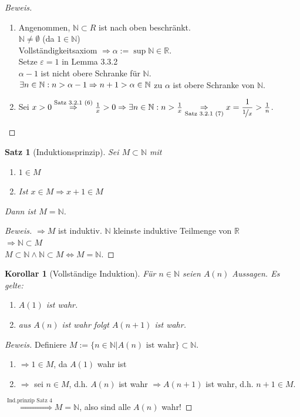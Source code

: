 \documentclass[12pt,a4paper,titlepage]{article} %
\newtheorem{satz}{Satz}[subsection]
\newtheorem{kor}{Korollar}
\theoremstyle{definition}
\theoremstyle{remark}
\newenvironment{bew}{\begin{proof}[Beweis]}{\end{proof}}
\begin{document}
\begin{bew}
	\begin{enumerate}
		\item Angenommen, $\mathbb{N}\subset{R}$ ist nach oben beschränkt.\\
		$\mathbb{N} \neq \emptyset$ (da $1\in\mathbb{N}$)\\
		Vollständigkeitsaxiom $\Rightarrow \alpha := \sup \mathbb{N} \in \mathbb{R}$.\\
		Setze $\varepsilon = 1$ in Lemma 3.3.2\\ %
		$\alpha -1$ ist nicht obere Schranke für $\mathbb{N}$.\\
		$\exists n\in \mathbb{N}: n>\alpha-1\\
		\Rightarrow n+1 > \alpha \in \mathbb{N}$ \Lightning  zu $\alpha$ ist obere Schranke von $\mathbb{N}$.
		\item Sei $x>0 \overset{\text{Satz 3.2.1 (6)}}{\Rightarrow} \frac{1}{x} > 0\Rightarrow \exists n\in \mathbb{N}: n > \frac{1}{x}\underset{\text{Satz 3.2.1 (7)}}{\Rightarrow} x = \dfrac{1}{\nicefrac{1}{x}} > \frac{1}{n}$. %
	\end{enumerate}
\end{bew}
\begin{satz}[Induktionsprinzip]
	Sei $M\subset \mathbb{N}$ mit 
	\begin{enumerate}
		\item $1\in M$
		\item Ist $x\in M \Rightarrow x+1 \in M$
	\end{enumerate}
	Dann ist $M= \mathbb{N}$.
\end{satz}
\begin{bew}
	$\Rightarrow M$ ist induktiv. $\mathbb{N}$ kleinste induktive Teilmenge von $\mathbb{R}$\\
	$\Rightarrow \mathbb{N} \subset M$\\
	$M\subset \mathbb{N} \wedge \mathbb{N} \subset M \Leftrightarrow M = \mathbb{N}$.
\end{bew}
\begin{kor}[Vollständige Induktion]
	Für $n\in\mathbb{N}$ seien $A(n)$ Aussagen.
	Es gelte:
	\begin{enumerate}
		\item $A(1)$ ist wahr.
		\item aus $A(n)$ ist wahr folgt $A(n+1)$ ist wahr.
	\end{enumerate}
\end{kor}
\begin{bew}
	Definiere $M := \{n\in \mathbb{N}| A(n) \text{ ist wahr}\} \subset \mathbb{N}$.
	\begin{enumerate}
		\item $\Rightarrow 1\in M$, da $A(1)$ wahr ist
		\item $\Rightarrow$ sei $n\in M$, d.h. $A(n)$ ist wahr $\Rightarrow A(n+1)$ ist wahr, d.h. $n+1\in M$.
	\end{enumerate}
	$\overset{\text{Ind.prinzip Satz 4}}{\Rightarrow} M = \mathbb{N}$, also sind alle $A(n)$ wahr! %
\end{bew}
\end{document}
